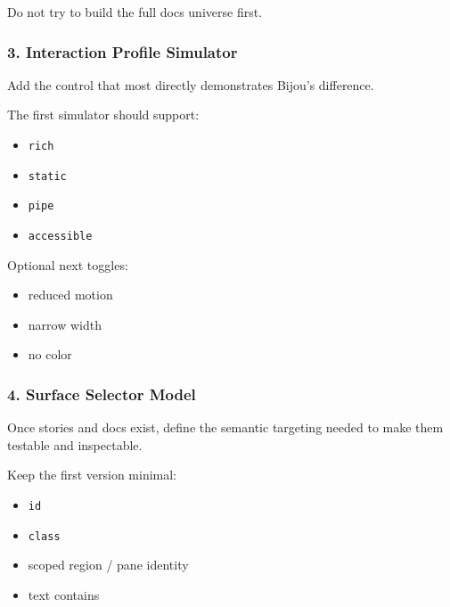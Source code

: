 Do not try to build the full docs universe first.

\subsubsection{3. Interaction Profile Simulator}\label{record-042-interaction-profile-simulator-1}

Add the control that most directly demonstrates Bijou's difference.

The first simulator should support:

\begin{itemize}
\tightlist
\item
  \texttt{r\allowbreak{}i\allowbreak{}c\allowbreak{}h}
\item
  \texttt{s\allowbreak{}t\allowbreak{}a\allowbreak{}t\allowbreak{}i\allowbreak{}c}
\item
  \texttt{p\allowbreak{}i\allowbreak{}p\allowbreak{}e}
\item
  \texttt{a\allowbreak{}c\allowbreak{}c\allowbreak{}e\allowbreak{}s\allowbreak{}s\allowbreak{}i\allowbreak{}b\allowbreak{}l\allowbreak{}e}
\end{itemize}

Optional next toggles:

\begin{itemize}
\tightlist
\item
  reduced motion
\item
  narrow width
\item
  no color
\end{itemize}

\subsubsection{4. Surface Selector Model}\label{record-042-surface-selector-model-1}

Once stories and docs exist, define the semantic targeting needed to make them testable and inspectable.

Keep the first version minimal:

\begin{itemize}
\tightlist
\item
  \texttt{i\allowbreak{}d}
\item
  \texttt{c\allowbreak{}l\allowbreak{}a\allowbreak{}s\allowbreak{}s}
\item
  scoped region / pane identity
\item
  text contains
\end{itemize}

